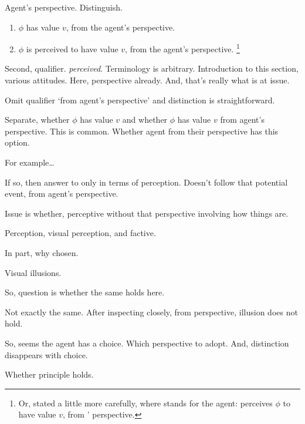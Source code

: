 \begin{note}
  Agent's perspective.
  Distinguish.

  \begin{enumerate}
  \item
    \(\phi\) has value \(v\), from the agent's perspective.
  \item
    \(\phi\) is perceived to have value \(v\), from the agent's perspective.%
    \footnote{
      Or, stated a little more carefully, where \vAgent{} stands for the agent:
      \vAgent{} perceives \(\phi\) to have value \(v\), from \vAgent{}' perspective.
    }
  \end{enumerate}

  Second, qualifier.
  \emph{perceived}.
  Terminology is arbitrary.
  Introduction to this section, various attitudes.
  Here, perspective already.
  And, that's really what is at issue.

  Omit qualifier `from agent's perspective' and distinction is straightforward.

  Separate, whether \(\phi\) has value \(v\) and whether \(\phi\) has value \(v\) from agent's perspective.
  This is common.
  Whether agent from their perspective has this option.

  For example\dots

  If so, then answer to \qzS{} only in terms of perception.
  Doesn't follow that potential event, from agent's perspective.

  Issue is whether, perceptive without that perspective involving how things are.

  Perception, visual perception, and factive.

  In part, why chosen.

  Visual illusions.

  So, question is whether the same holds here.

  Not exactly the same.
  After inspecting closely, from perspective, illusion does not hold.

  So, seems the agent has a choice.
  Which perspective to adopt.
  And, distinction disappears with choice.

  Whether principle holds.
\end{note}

